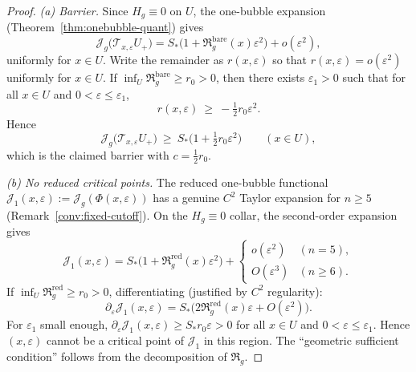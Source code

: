 \documentclass[11pt,reqno,a4paper]{amsart}
\numberwithin{equation}{section}
\theoremstyle{plain}
\theoremstyle{remark}
\theoremstyle{plain}
\begin{document}
\begin{proof}
\emph{(a) Barrier.} Since $H_g\equiv0$ on $U$, the one-bubble expansion (Theorem~\ref{thm:onebubble-quant}) gives
\[
\mathcal J_g\big(\mathcal T_{x,\varepsilon}U_+\big)
= S_\ast\Big(1+\mathfrak R_g^{\mathrm{bare}}(x)\varepsilon^2\Big)+o(\varepsilon^2),
\]
uniformly for $x\in U$. Write the remainder as $r(x,\varepsilon)$ so that
$r(x,\varepsilon)=o(\varepsilon^2)$ uniformly for $x\in U$. If $\inf_U\mathfrak R_g^{\mathrm{bare}}\ge r_0>0$,
then there exists $\varepsilon_1>0$ such that for all $x\in U$ and $0<\varepsilon\le\varepsilon_1$,
\[
r(x,\varepsilon)\ \ge\ -\tfrac12 r_0\varepsilon^2.
\]
Hence
\[
\mathcal J_g\big(\mathcal T_{x,\varepsilon}U_+\big)\ \ge\ S_\ast\Big(1+\tfrac12 r_0\varepsilon^2\Big)
\qquad (x\in U),
\]
which is the claimed barrier with $c=\tfrac12 r_0$.

\medskip
\emph{(b) No reduced critical points.}
The reduced one-bubble functional
$\mathcal J_1(x,\varepsilon):=\mathcal J_g(\Phi(x,\varepsilon))$
has a genuine $C^2$ Taylor expansion for $n\ge5$
(Remark~\ref{conv:fixed-cutoff}).
On the $H_g\equiv0$ collar, the second-order expansion gives
\[
\mathcal J_1(x,\varepsilon)
= S_\ast\big(1+\mathfrak R_g^{\mathrm{red}}(x)\varepsilon^2\big)
+ \begin{cases}o(\varepsilon^2)&(n=5),\\O(\varepsilon^3)&(n\ge6).\end{cases}
\]
If $\inf_U\mathfrak R_g^{\mathrm{red}}\ge r_0>0$, differentiating
(justified by $C^2$ regularity):
\[
\partial_\varepsilon \mathcal J_1(x,\varepsilon)
= S_\ast\big(2\mathfrak R_g^{\mathrm{red}}(x)\varepsilon+O(\varepsilon^2)\big).
\]
For $\varepsilon_1$ small enough,
$\partial_\varepsilon \mathcal J_1(x,\varepsilon)\ge S_\ast r_0\varepsilon>0$
for all $x\in U$ and $0<\varepsilon\le\varepsilon_1$.
Hence $(x,\varepsilon)$ cannot be a critical point of $\mathcal J_1$ in this region.
The ``geometric sufficient condition'' follows from the decomposition of $\mathfrak R_g$.
\end{proof}
\end{document}
